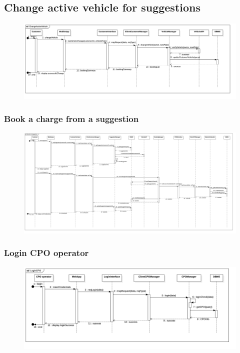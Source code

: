 \subsection{Change active vehicle for suggestions}
\begin{figure}[H]
    \begin{center}
        \includegraphics[width=\textwidth]{img/runtime/change_vehicle.png}
    \end{center}
\end{figure}
\subsubsection{Book a charge from a suggestion}
\begin{figure}[H]
    \begin{center}
        \includegraphics[width=\textwidth]{img/runtime/suggestion.png}
    \end{center}
\end{figure}
\subsubsection{Login CPO operator}
\begin{figure}[H]
    \begin{center}
        \includegraphics[width=\textwidth]{img/runtime/cpo_login}
    \end{center}
\end{figure}
